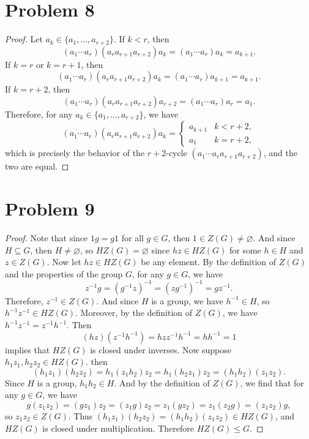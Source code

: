 \documentclass[12pt]{article}
\newcommand{\<}{\left\langle}
\renewcommand{\>}{\right\rangle}
\let\emptyset\varnothing
\begin{document}
\section*{Problem 8}

\begin{proof}
    Let $a_k\in\{a_1,\dots,a_{r+2}\}$. If $k<r$, then
    \[(a_1\cdots a_r)(a_ra_{r+1}a_{r+2})a_k = (a_1\cdots a_r)a_k = a_{k+1}.\]
    If $k=r$ or $k=r+1$, then
    \[(a_1\cdots a_r)(a_ra_{r+1}a_{r+2})a_k = (a_1\cdots a_r)a_{k+1} = a_{k+1}.\]
    If $k=r+2$, then
    \[(a_1\cdots a_r)(a_ra_{r+1}a_{r+2})a_{r+2} = (a_1\cdots a_r)a_r = a_1.\]
    Therefore, for any $a_k\in\{a_1,\dots,a_{r+2}\}$, we have
    \[(a_1\cdots a_r)(a_ra_{r+1}a_{r+2})a_k = \begin{cases}
        a_{k+1} & k<{r+2},\\
        a_1 & k=r+2,
    \end{cases}\]
    which is precisely the behavior of the $r+2$-cycle $(a_1\cdots a_ra_{r+1}a_{r+2})$, and the two are equal.
    
\end{proof}

\section*{Problem 9}

\begin{proof}
    Note that since $1g=g1$ for all $g\in G$, then $1\in Z(G)\ne \emptyset$. And since $H\subseteq G$, then $H\ne\emptyset$, so $HZ(G)=\emptyset$ since $hz\in HZ(G)$ for some $h\in H$ and $z\in Z(G)$. Now let $hz\in HZ(G)$ be any element. By the definition of $Z(G)$ and the properties of the group $G$, for any $g\in G$, we have
    \[z^{-1}g = (g^{-1}z)^{-1} = (zg^{-1})^{-1} = gz^{-1}.\]
    Therefore, $z^{-1}\in Z(G)$. And since $H$ is a group, we have $h^{-1}\in H$, so $h^{-1}z^{-1}\in HZ(G)$. Moreover, by the definition of $Z(G)$, we have $h^{-1}z^{-1} = z^{-1}h^{-1}$. Then
    \[(hz)(z^{-1}h^{-1}) = hzz^{-1}h^{-1} = hh^{-1} = 1\]
    implies that $HZ(G)$ is closed under inverses. Now suppose $h_1z_1,h_2z_2\in HZ(G)$. then
    \[(h_1z_1)(h_2z_2) = h_1(z_1h_2)z_2 = h_1(h_2z_1)z_2 = (h_1h_2)(z_1z_2).\]
    Since $H$ is a group, $h_1h_2\in H$. And by the definition of $Z(G)$, we find that for any $g\in G$, we have
    \[g(z_1z_2) = (gz_1)z_2 = (z_1g)z_2 = z_1(gz_2) = z_1(z_2g) = (z_1z_2)g,\]
    so $z_1z_2\in Z(G)$. Thus $(h_1z_1)(h_2z_2) = (h_1h_2)(z_1z_2) \in HZ(G)$, and $HZ(G)$ is closed under multiplication. Therefore $HZ(G)\leq G$.

    
\end{proof}
\end{document}
